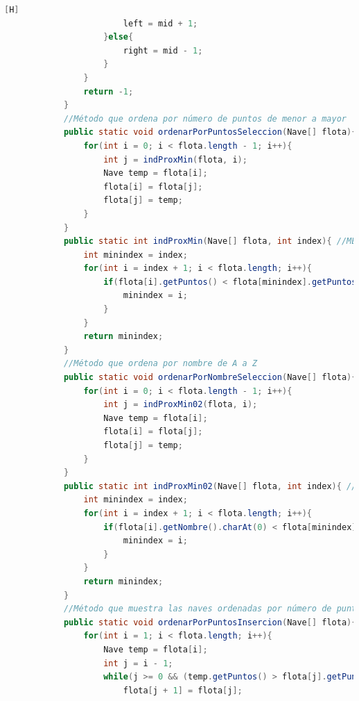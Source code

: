 \documentclass{article}
\begin{document}
\begin{lstlisting}[language=java,caption={Las lineas de codigo de lo creado:}][H]
						left = mid + 1;
					}else{
						right = mid - 1;
					}
				}
				return -1;
			}
			//Método que ordena por número de puntos de menor a mayor
			public static void ordenarPorPuntosSeleccion(Nave[] flota){ //METODO COMPLETADO QUE NOS PERMITE CAMBIAR LAS POSICIONES DE CADA ARREGLO DEPENDIENDO DE LO QUE RETORNE EL METODO indProxMin que sera el indice cual debemos cambiar con el actual
				for(int i = 0; i < flota.length - 1; i++){
					int j = indProxMin(flota, i);
					Nave temp = flota[i];
					flota[i] = flota[j];
					flota[j] = temp;
				}
			}
			public static int indProxMin(Nave[] flota, int index){ //METODO CREADO QUE NOS AYUDA A BUSCAR EL INDICE DEL OBJETO Y NOS DICE CUAL ES EL PROXIMO MENOR  APARTIR DEL QUE ESTAMOS Y VA PASANDO POR TODOS LOS ELEMENTOS ASI QUE VA ACTUALIZANDOSE LA VARIABLE MINDEX
				int minindex = index;
				for(int i = index + 1; i < flota.length; i++){
					if(flota[i].getPuntos() < flota[minindex].getPuntos()){
						minindex = i;
					}
				}
				return minindex;
			}
			//Método que ordena por nombre de A a Z
			public static void ordenarPorNombreSeleccion(Nave[] flota){ //METODO COMPLETADO QUE NOS PERMITE CAMBIAR LAS POSICIONES DE CADA ARREGLO DEPENDIENDO DE LO QUE RETORNE EL METODO indProxMin que sera el indice cual debemos cambiar con el actual
				for(int i = 0; i < flota.length - 1; i++){
					int j = indProxMin02(flota, i);
					Nave temp = flota[i];
					flota[i] = flota[j];
					flota[j] = temp;
				}
			}
			public static int indProxMin02(Nave[] flota, int index){ //METODO CREADO QUE NOS AYUDA A BUSCAR EL INDICE DEL OBJETO Y NOS DICE CUAL ES EL PROXIMO MENOR EN TERMINOS DE A HASTA Z APARTIR DEL QUE ESTAMOS Y VA PASANDO POR TODOS LOS ELEMENTOS ASI QUE VA ACTUALIZANDOSE LA VARIABLE MINDEX
				int minindex = index;
				for(int i = index + 1; i < flota.length; i++){
					if(flota[i].getNombre().charAt(0) < flota[minindex].getNombre().charAt(0)){
						minindex = i;
					}
				}
				return minindex;
			}
			//Método que muestra las naves ordenadas por número de puntos de mayor a menor
			public static void ordenarPorPuntosInsercion(Nave[] flota){ //Este metodo ordenarPorPuntosInsercion() consiste en recorrer todo el array comenzando desde el segundo elemento hasta el final. Para cada elemento, se trata de colocarlo en el lugar correcto entre todos los elementos con menor punto anteriores a él y asi por cada uno completando del mayor al menor 
				for(int i = 1; i < flota.length; i++){
					Nave temp = flota[i];
					int j = i - 1;
					while(j >= 0 && (temp.getPuntos() > flota[j].getPuntos())){
						flota[j + 1] = flota[j];

\end{lstlisting}
\end{document}

